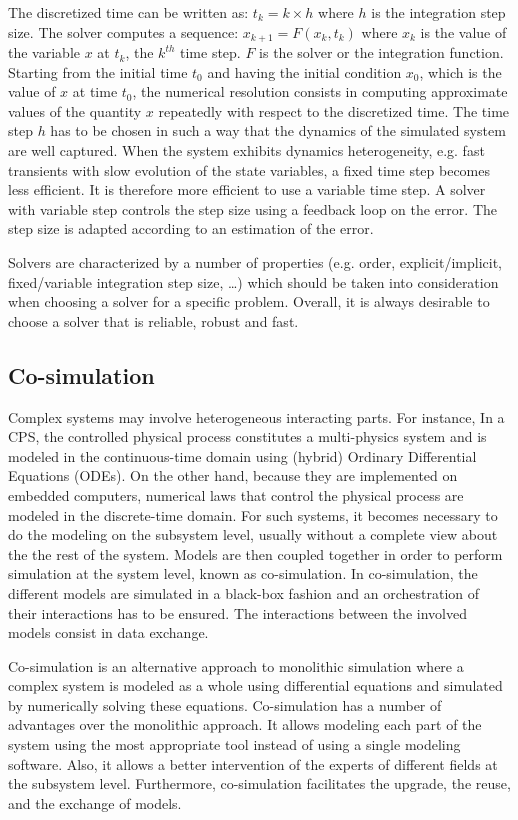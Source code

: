 The discretized time can be written as: $t_k = k \times h$ where $h$ is the integration step size. The solver computes a sequence: $x_{k+1} = F(x_k,t_k)$ where $x_k$ is the value of the variable $x$ at $t_k$, the $k^{th}$ time step. $F$ is the solver or the integration function. Starting from the initial time $t_0$ and having the initial condition $x_0$, which is the value of $x$ at time $t_0$, the numerical resolution consists in computing approximate values of the quantity $x$ repeatedly with respect to the discretized time. The time step $h$ has to be chosen in such a way that the dynamics of the simulated system are well captured. When the system exhibits dynamics heterogeneity, e.g. fast transients with slow evolution of the state variables, a fixed time step becomes less efficient. It is therefore  more efficient to use a variable time step. A solver with variable step controls the step size using a feedback loop on the error. The step size is adapted according to an estimation of the error. 

Solvers are characterized by a number of properties (e.g. order, explicit/implicit, fixed/variable integration step size, \ldots) which should be taken into consideration when choosing a solver for a specific problem. Overall, it is always desirable to choose a solver that is reliable, robust and fast.

\subsection{Co-simulation}

Complex systems may involve heterogeneous interacting parts. For instance, In a CPS, the controlled physical process constitutes a multi-physics system and is modeled in the continuous-time domain using (hybrid) Ordinary Differential Equations (ODEs). On the other hand, because they are implemented on embedded computers, numerical laws that control the physical process are modeled in the discrete-time domain. For such systems, it becomes necessary to do the modeling on the subsystem level, usually without a complete view about the the rest of the system. Models are then coupled together in order to perform simulation at the system level, known as co-simulation. In co-simulation, the different models are simulated in a black-box fashion and an orchestration of their interactions has to be ensured. The interactions between the involved models consist in data exchange.

Co-simulation is an alternative approach to monolithic simulation where a complex system is modeled as a whole using differential equations and simulated by numerically solving these equations. Co-simulation has a number of advantages over the monolithic approach. It allows modeling each part of the system using the most appropriate tool instead of using a single modeling software. Also, it allows a better intervention of the experts of different fields at the subsystem level. Furthermore, co-simulation facilitates the upgrade, the reuse, and the exchange of models. 

